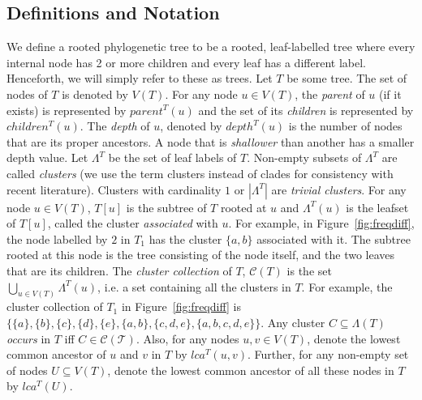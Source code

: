 \documentclass{article}
\newcommand{\leafset}{\Lambda}
\begin{document}
    \subsection{Definitions and Notation}
    \label{subsec:def}

    We define a rooted phylogenetic tree to be a rooted, leaf-labelled tree where every internal node has 2 or more children and every leaf has a different label. Henceforth, we will simply refer to these as trees. Let $T$ be some tree. The set of nodes of $T$ is denoted by $V(T)$. For any node $u \in V(T)$, the \textit{parent} of $u$ (if it exists) is represented by $parent^T(u)$ and the set of its \textit{children} is represented by $children^T(u)$. The \textit{depth} of $u$, denoted by $depth^T(u)$ is the number of nodes that are its proper ancestors. A node that is \textit{shallower} than another has a smaller depth value. Let $\leafset^T$ be the set of leaf labels of $T$. Non-empty subsets of $\leafset^T$ are called \textit{clusters} (we use the term clusters instead of clades for consistency with recent literature). Clusters with cardinality $1$ or $|\leafset^T|$ are \textit{trivial clusters}. For any node $u \in V(T)$, $T[u]$ is the subtree of $T$ rooted at $u$ and $\leafset^T(u)$ is the leafset of $T[u]$, called the cluster \textit{associated} with $u$. For example, in Figure~\ref{fig:freqdiff}, the node labelled by $2$ in $T_1$ has the cluster $\{a, b\}$ associated with it. The subtree rooted at this node is the tree consisting of the node itself, and the two leaves that are its children. The \textit{cluster collection} of $T$, $\mathcal{C}(T)$ is the set $\bigcup_{u \in V(T)} {\leafset^T(u)}$, i.e. a set containing all the clusters in $T$. For example, the cluster collection of $T_1$ in Figure~\ref{fig:freqdiff} is $\{\{a\}, \{b\}, \{c\}, \{d\}, \{e\}, \{a, b\}, \{c, d, e\}, \{a, b, c, d, e\}\}$. Any cluster $C \subseteq \leafset(T)$ \textit{occurs} in $T$ iff $C \in \mathcal{C(T)}$. Also, for any nodes $u, v \in V(T)$, denote the lowest common ancestor of $u$ and $v$ in $T$ by $lca^T(u, v)$. Further, for any non-empty set of nodes $U \subseteq V(T)$, denote the lowest common ancestor of all these nodes in $T$ by $lca^T(U)$.
\end{document}
